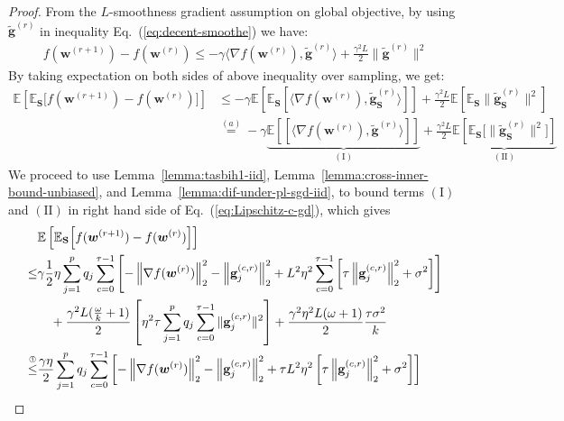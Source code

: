 \documentclass[twoside]{article}
\begin{document}
\begin{proof}
From the $L$-smoothness gradient assumption on global objective, by using  $\tilde{\mathbf{g}}^{(r)}$ in inequality Eq.~(\ref{eq:decent-smoothe}) we have:
\begin{align}
    f({\boldsymbol{w}}^{(r+1)})-f({\boldsymbol{w}}^{(r)})\leq -\gamma \big\langle\nabla f({\boldsymbol{w}}^{(r)}),\tilde{\mathbf{g}}^{(r)}\big\rangle+\frac{\gamma^2 L}{2}\|\tilde{\mathbf{g}}^{(r)}\|^2\label{eq:Lipschitz-c1}
\end{align}
By taking expectation on both sides of above inequality over sampling, we get:
\begin{align}
    \mathbb{E}\left[\mathbb{E}_\mathbf{S}\Big[f({\boldsymbol{w}}^{(r+1)})-f({\boldsymbol{w}}^{(r)})\Big]\right]&\leq -\gamma\mathbb{E}\left[\mathbb{E}_\mathbf{S}\left[ \big\langle\nabla f({\boldsymbol{w}}^{(r)}),\tilde{\mathbf{g}}_\mathbf{S}^{(r)}\big\rangle\right]\right]+\frac{\gamma^2 L}{2}\mathbb{E}\left[\mathbb{E}_\mathbf{S}\|\tilde{\mathbf{g}}_\mathbf{S}^{(r)}\|^2\right]\nonumber\\
    &\stackrel{(a)}{=}-\gamma\underbrace{\mathbb{E}\left[\left[ \big\langle\nabla f({\boldsymbol{w}}^{(r)}),\tilde{\mathbf{g}}^{(r)}\big\rangle\right]\right]}_{(\mathrm{I})}+\frac{\gamma^2 L}{2}\underbrace{\mathbb{E}\left[\mathbb{E}_\mathbf{S}\Big[\|\tilde{\mathbf{g}}_\mathbf{S}^{(r)}\|^2\Big]\right]}_{\mathrm{(II)}}\label{eq:Lipschitz-c-gd}
\end{align}
We proceed to use Lemma~\ref{lemma:tasbih1-iid}, Lemma~\ref{lemma:cross-inner-bound-unbiased}, and Lemma~\ref{lemma:dif-under-pl-sgd-iid}, to bound  terms $(\mathrm{I})$ and $(\mathrm{II})$ in right hand side of Eq.~(\ref{eq:Lipschitz-c-gd}), which gives
\begin{align}
     &\mathbb{E}\left[\mathbb{E}_{\mathbf{S}}\Big[f({\boldsymbol{w}}^{(r+1)})-f({\boldsymbol{w}}^{(r)})\Big]\right]\nonumber\\
     \leq& \gamma\frac{1}{2}\eta\sum_{j=1}^pq_j\sum_{c=0}^{\tau-1}\left[-\left\|\nabla f({\boldsymbol{w}}^{(r)})\right\|_2^2-\left\|\mathbf{g}_j^{(c,r)}\right\|_2^2+L^2\eta^2\sum_{c=0}^{\tau-1}\left[\tau\left\|{\mathbf{g}}_j^{(c,r)}\right\|_2^2+\sigma^2\right]\right]\nonumber\\
     &\quad+\frac{\gamma^2 L(\frac{\omega}{k}+1)}{2}\left[{\eta^2\tau}\sum_{j=1}^pq_j\sum_{c=0}^{\tau-1}\|\mathbf{g}^{(c,r)}_{j}\|^2\right]+\frac{\gamma^2\eta^2 L(\omega+1)}{2}\frac{\tau \sigma^2}{k}\nonumber\\
     \stackrel{\text{\ding{192}}}{\leq}&\frac{\gamma\eta}{2}\sum_{j=1}^pq_j\sum_{c=0}^{\tau-1}\left[-\left\|\nabla f({\boldsymbol{w}}^{(r)})\right\|_2^2-\left\|\mathbf{g}_j^{(c,r)}\right\|_2^2+\tau L^2\eta^2\left[\tau\left\|{\mathbf{g}}_j^{(c,r)}\right\|_2^2+\sigma^2\right]\right]\nonumber\\

\end{align}
\end{proof}
\end{document}
